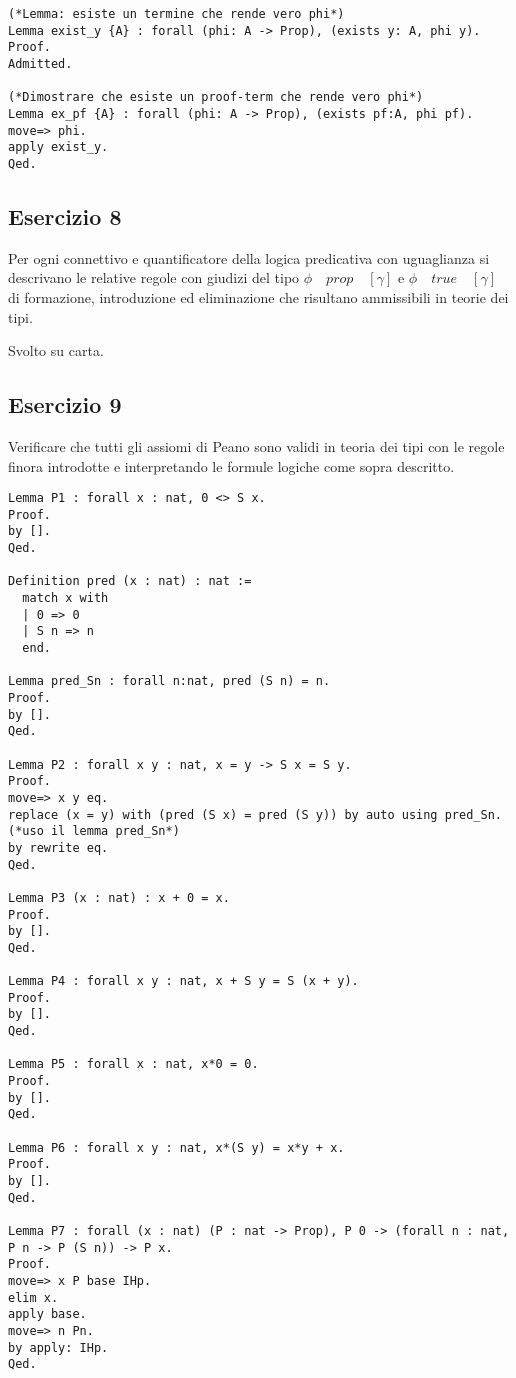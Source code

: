 \begin{lstlisting}[language=Coq]
(*Lemma: esiste un termine che rende vero phi*)
Lemma exist_y {A} : forall (phi: A -> Prop), (exists y: A, phi y).
Proof.
Admitted.

(*Dimostrare che esiste un proof-term che rende vero phi*)
Lemma ex_pf {A} : forall (phi: A -> Prop), (exists pf:A, phi pf).
move=> phi.
apply exist_y.
Qed.
\end{lstlisting}

\subsection{Esercizio 8}

Per ogni connettivo e quantificatore della logica predicativa con uguaglianza si
descrivano le relative regole con giudizi del tipo $\phi \quad prop \quad [\gamma]$ e
$\phi \quad true \quad [\gamma]$ di formazione, introduzione ed eliminazione che risultano
ammissibili in teorie dei tipi.

Svolto su carta.

\subsection{Esercizio 9}

Verificare che tutti gli assiomi di Peano sono validi in teoria dei tipi con le
regole finora introdotte e interpretando le formule logiche come sopra
descritto.

\begin{lstlisting}[language=Coq]
Lemma P1 : forall x : nat, 0 <> S x.
Proof.
by [].
Qed.

Definition pred (x : nat) : nat :=
  match x with
  | 0 => 0
  | S n => n
  end.

Lemma pred_Sn : forall n:nat, pred (S n) = n.
Proof.
by [].
Qed.

Lemma P2 : forall x y : nat, x = y -> S x = S y.
Proof.
move=> x y eq.
replace (x = y) with (pred (S x) = pred (S y)) by auto using pred_Sn. (*uso il lemma pred_Sn*)
by rewrite eq.
Qed.

Lemma P3 (x : nat) : x + 0 = x.
Proof.
by [].
Qed.

Lemma P4 : forall x y : nat, x + S y = S (x + y).
Proof.
by [].
Qed.

Lemma P5 : forall x : nat, x*0 = 0.
Proof.
by [].
Qed.

Lemma P6 : forall x y : nat, x*(S y) = x*y + x.
Proof.
by [].
Qed.

Lemma P7 : forall (x : nat) (P : nat -> Prop), P 0 -> (forall n : nat, P n -> P (S n)) -> P x.
Proof.
move=> x P base IHp.
elim x.
apply base.
move=> n Pn.
by apply: IHp.
Qed.
\end{lstlisting}
